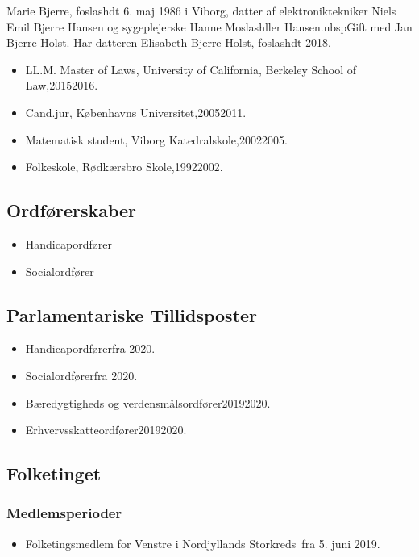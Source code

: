 \documentclass[11pt, a4paper]{awesome-cv}
\begin{document}
\makecvheader[R]
\makelettertitle
\begin{cvletter}
Marie Bjerre, foslashdt 6. maj 1986 i Viborg, datter af elektroniktekniker Niels Emil Bjerre Hansen og sygeplejerske Hanne Moslashller Hansen.nbspGift med Jan Bjerre Holst. Har datteren Elisabeth Bjerre Holst, foslashdt 2018.

\begin{itemize}
\item LL.M. Master of Laws, University of California, Berkeley School of Law,20152016.
\item Cand.jur, Københavns Universitet,20052011.
\item Matematisk student, Viborg Katedralskole,20022005.
\item Folkeskole, Rødkærsbro Skole,19922002.
\end{itemize}
\subsection*{Ordførerskaber}
\begin{itemize}
\item Handicapordfører
\item Socialordfører
\end{itemize}
\subsection*{Parlamentariske Tillidsposter}
\begin{itemize}
\item Handicapordførerfra 2020.
\item Socialordførerfra 2020.
\item Bæredygtigheds og verdensmålsordfører20192020.
\item Erhvervsskatteordfører20192020.
\end{itemize}
\subsection*{Folketinget}
\subsubsection*{Medlemsperioder}
\begin{itemize}
\item Folketingsmedlem for Venstre i Nordjyllands Storkreds fra 5. juni 2019.
\end{itemize}

\end{cvletter}
\end{document}
